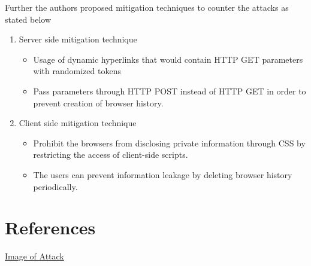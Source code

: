 \documentclass{article}
\begin{document}
Further the authors proposed mitigation techniques to counter the attacks as stated below
\begin{enumerate}
\item  Server­ side mitigation technique
\begin{itemize}
\item Usage of dynamic hyperlinks that would contain HTTP GET parameters with randomized tokens
\item Pass parameters through HTTP POST instead of HTTP GET in order to prevent creation of browser history.
\end{itemize}
   
\item  Client ­side mitigation technique 
\begin{itemize}
\item	Prohibit the browsers from disclosing private information through CSS by restricting the access of client-side scripts. 
\item	The users can prevent information leakage by deleting browser history periodically. 
\end{itemize}
\end{enumerate}

 
\section{References}

 \href{http://www.cs.wustl.edu/~jain/cse571-11/ftp/social/index.html}{Image of Attack}
\end{document}
